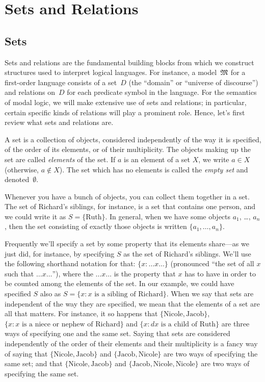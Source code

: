 \documentclass[misc]{subfiles}
\begin{document}
\section{Sets and Relations}\label{sec:Sets-and-Relations}


\subsection{Sets}\label{ssec:Sets}

Sets and relations are the fundamental building blocks from which
we construct structures used to interpret logical languages. For instance,  a model~$\mathfrak M$
for a first-order language consists of a set~$D$ (the ``domain''
or ``universe of discourse'') and relations on~$D$ for each predicate
symbol in the language. For the semantics of modal logic, we will
make extensive use of sets and relations; in particular, certain specific
kinds of relations will play a prominent role. Hence, let's first
review what sets and relations are.

\begin{defn}
A set is a collection of objects, considered independently of the
way it is specified, of the order of its elements, or of their
multiplicity. The objects making up the set are called \emph{elements} of
the set. If $a$ is an element of a set $X$, we write $a \in X$ (otherwise,
$a \notin X$). The set which has no elements is called the \emph{empty set}
and denoted~$\emptyset$.
\end{defn}

\begin{ex}
Whenever you have a bunch of objects, you can collect them together
in a set. The set of Richard's siblings, for instance, is a set that
contains one person, and we could write it as $S=\{\textrm{Ruth}\}$.
In general, when we have some objects $a_{1}$, \dots{}, $a_{n}$,
then the set consisting of exactly those objects is written $\{a_{1},\dots,a_{n}\}$.
\end{ex}

Frequently we'll specify a set by some property that its elements
share---as we just did, for instance, by specifying $S$ as the set
of Richard's siblings. We'll use the following shorthand notation
for that: $\{x : \ldots x \ldots\}$ (pronounced ``the set of all
$x$ such that $\ldots x\ldots$''), where the $\ldots x\ldots$
is the property that $x$ has to have in order to be counted among
the elements of the set. In our example, we could have specified $S$
also as $S=\{x : x\text{ is a sibling of Richard}\}$. When we say
that sets are independent of the way they are specified, we mean
that the elements of a set are all that matters. For instance, it
so happens that $\{\text{Nicole},\text{Jacob}\}$, $\{x : x\text{ is a niece or nephew of Richard}\}$ and
$\{x :d x\text{ is a child of Ruth}\}$ are three ways of specifying
one and the same set. Saying that sets are considered independently
of the order of their elements and their multiplicity is a fancy way
of saying that $\{\text{Nicole}, \text{Jacob}\}$ and $\{\text{Jacob},\text{Nicole}\}$ are
two ways of specifying the same set; and that $\{\text{Nicole},\text{Jacob}\}$
and $\{\text{Jacob},\text{Nicole}, \text{Nicole}\}$ are two ways of
specifying the same set.
\end{document}
